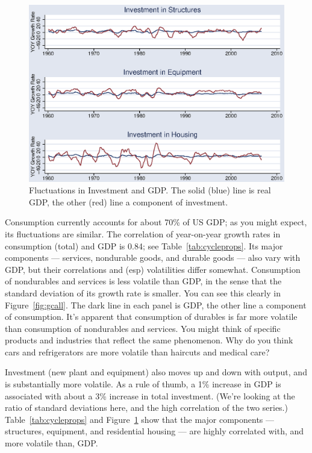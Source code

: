 \documentclass[letterpaper,12pt]{article}
\begin{document}
\begin{figure}[h!]
    \centering
    \includegraphics[scale=0.8]{usgiall.eps}
    \caption{Fluctuations in Investment and GDP.
    The solid (blue) line is real GDP, the other (red) line
    a component of investment.}
    \label{fig:giall}%
\end{figure}

Consumption currently accounts for about 70\% of US GDP;
as you might expect, its fluctuations are similar.
The correlation of year-on-year growth rates in consumption (total)
and GDP is 0.84; see Table~\ref{tab:cycleprops}.
Its major components --- services, nondurable goods,
and durable goods --- also vary with GDP,
but their correlations and (esp) volatilities differ somewhat.
Consumption of nondurables and services
is less volatile than GDP, in the sense that
the standard deviation of its growth rate is smaller.
You can see this clearly in Figure~\ref{fig:gcall}.
The dark line in each panel is GDP,
the other line a component of consumption.
It's apparent that consumption of durables is far more
volatile %
than consumption of nondurables and services.
You might think of specific products and industries that reflect
the same phenomenon.
Why do you think cars and refrigerators
are more volatile than haircuts and medical care?


Investment (new plant and equipment) also moves up and down with output,
and is substantially more volatile.
As a rule of thumb, a 1\% increase in GDP is associated with
about a 3\% increase in total investment.
(We're looking at the ratio of standard deviations here,
and the high correlation of the two series.)
Table~\ref{tab:cycleprops} and Figure~\ref{fig:giall}
show that the major components --- structures, equipment,
and residential housing --- are highly correlated with,
and more volatile than, GDP.
\end{document}

